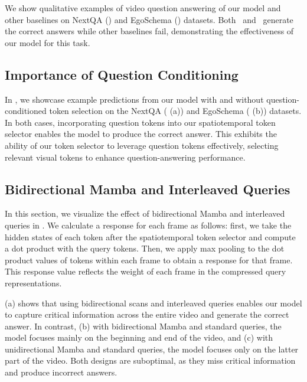 We show qualitative examples of video question answering of our model and other baselines on NextQA () and EgoSchema () datasets. Both \modelLlava\ and \modelLlama\ generate the correct answers while other baselines fail, demonstrating the effectiveness of our model for this task. 

\subsection{Importance of Question Conditioning}
\label{sec:example question}

In , we showcase example predictions from our model with and without question-conditioned token selection on the NextQA ( (a)) and EgoSchema ( (b)) datasets. In both cases, incorporating question tokens into our spatiotemporal token selector enables the model to produce the correct answer. This exhibits the ability of our token selector to leverage question tokens effectively, selecting relevant visual tokens to enhance question-answering performance.


\subsection{Bidirectional Mamba and Interleaved Queries}
\label{sec:example bidirection}

In this section, we visualize the effect of bidirectional Mamba and interleaved queries in . We calculate a response for each frame as follows: first, we take the hidden states of each token after the spatiotemporal token selector and compute a dot product with the query tokens. Then, we apply max pooling to the dot product values of tokens within each frame to obtain a response for that frame. This response value reflects the weight of each frame in the compressed query representations.

 (a) shows that using bidirectional scans and interleaved queries enables our model to capture critical information across the entire video and generate the correct answer. In contrast, (b) with bidirectional Mamba and standard queries, the model focuses mainly on the beginning and end of the video, and (c) with unidirectional Mamba and standard queries, the model focuses only on the latter part of the video. Both designs are suboptimal, as they miss critical information and produce incorrect answers.

